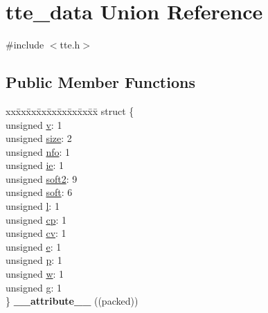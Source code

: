\hypertarget{uniontte__data}{}\section{tte\+\_\+data Union Reference}
\label{uniontte__data}


{\ttfamily \#include $<$tte.\+h$>$}

\subsection*{Public Member Functions}
\begin{DoxyCompactItemize}
\item 
\mbox{\label{uniontte__data_a0c5dae30429908452b96fa4bc145a329}} 
\begin{tabbing}
xx\=xx\=xx\=xx\=xx\=xx\=xx\=xx\=xx\=\kill
struct \{\\
\>unsigned \mbox{\hyperlink{uniontte__data_a70241fa15ba35540a3d739586d288a63}{v}}: 1\\
\>unsigned \mbox{\hyperlink{uniontte__data_a0ad2a8c6a1b45b62c004ebd8d4a0a230}{size}}: 2\\
\>unsigned \mbox{\hyperlink{uniontte__data_a272795ac59ecdbee574dc7ae39175de9}{nfo}}: 1\\
\>unsigned \mbox{\hyperlink{uniontte__data_ada6abfd50fd8a677288c35f4ec52427a}{ie}}: 1\\
\>unsigned \mbox{\hyperlink{uniontte__data_aaf148824c9b193c7e099a1a627ad7f3b}{soft2}}: 9\\
\>unsigned \mbox{\hyperlink{uniontte__data_ae0e85f3f1cf0fd0355a82aabafe73161}{soft}}: 6\\
\>unsigned \mbox{\hyperlink{uniontte__data_a63d897b9448dee5d0d19c0a798b61d24}{l}}: 1\\
\>unsigned \mbox{\hyperlink{uniontte__data_a2318b4bff67490b93215c915b6fab138}{cp}}: 1\\
\>unsigned \mbox{\hyperlink{uniontte__data_a65f1f70d5bc84743c18d0c3c198f8c36}{cv}}: 1\\
\>unsigned \mbox{\hyperlink{uniontte__data_a8bb7e896c8df99e176b73eaf4543021f}{e}}: 1\\
\>unsigned \mbox{\hyperlink{uniontte__data_a775130ca72c640944af03f330f3addca}{p}}: 1\\
\>unsigned \mbox{\hyperlink{uniontte__data_a3b6a0e0483211b6f9372308f80718a8a}{w}}: 1\\
\>unsigned \mbox{\hyperlink{uniontte__data_a5b6100ed70995bc3354654ef1546ee95}{g}}: 1\\
\} {\bfseries \_\_attribute\_\_} ((packed))\\

\end{tabbing}\end{DoxyCompactItemize}
